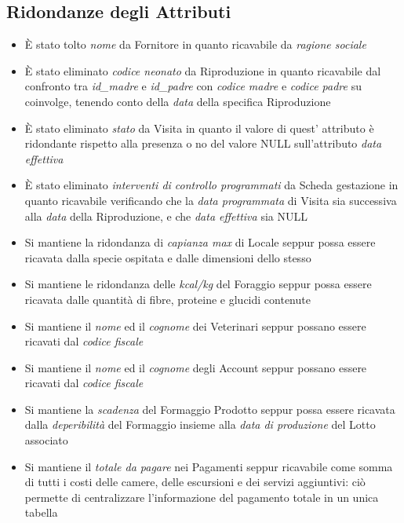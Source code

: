 \documentclass[12pt,a4paper]{article}
\begin{document}
\subsection{Ridondanze degli Attributi}
\label{subsec:ridondanze-attr}
\begin{itemize}

\item \`E stato tolto \textit{nome} da Fornitore in quanto ricavabile da \textit{ragione sociale}
\item \`E stato eliminato \textit{codice neonato} da Riproduzione in quanto ricavabile dal confronto tra \textit{id\_madre} e \textit{id\_padre} con \textit{codice madre} e \textit{codice padre} su coinvolge, tenendo conto della \textit{data} della specifica Riproduzione 
\item \`E stato eliminato \textit{stato} da Visita in quanto il valore di quest' attributo è ridondante rispetto alla presenza o no del valore NULL sull'attributo \textit{data effettiva}
\item \`E stato eliminato \textit{interventi di controllo programmati} da Scheda gestazione in quanto ricavabile verificando che la \textit{data programmata} di Visita sia successiva alla \textit{data} della Riproduzione, e che \textit{data effettiva} sia NULL
\item Si mantiene la ridondanza di \textit{capianza max} di Locale seppur possa essere ricavata dalla specie ospitata e dalle dimensioni dello stesso
\item Si mantiene le ridondanza delle \textit{kcal/kg} del Foraggio seppur possa essere ricavata dalle quantità di fibre, proteine e glucidi contenute
\item Si mantiene il \textit{nome} ed il \textit{cognome} dei Veterinari seppur possano essere ricavati dal \textit{codice fiscale}
\item Si mantiene il \textit{nome} ed il \textit{cognome} degli Account seppur possano essere ricavati dal \textit{codice fiscale}
\item Si mantiene la \textit{scadenza} del Formaggio Prodotto seppur possa essere ricavata dalla \textit{deperibilità} del Formaggio insieme alla \textit{data di produzione} del Lotto associato
\item Si mantiene il \textit{totale da pagare} nei Pagamenti seppur ricavabile come somma di tutti i costi delle camere, delle escursioni e dei servizi aggiuntivi: ciò permette di centralizzare l'informazione del pagamento totale in un unica tabella
\end{itemize}
\end{document}

